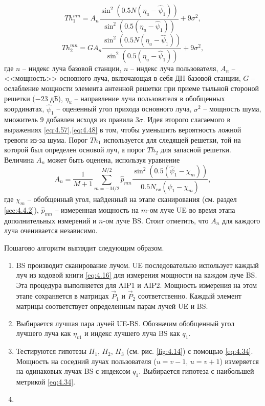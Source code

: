 \begin{equation}
    \label{eq:4.57}
    Th_1^{mn} = A_n \frac{\sin^2(0.5 N (\eta_u - \hat \psi_1))}{\sin^2(0.5 (\eta_u - \hat \psi_1))} + 9 \sigma^2,
\end{equation}
\begin{equation}
    \label{eq:4.58}
    Th_2^{mn} = G A_n \frac{\sin^2(0.5 N (\eta_u - \hat \psi_1))}{\sin^2(0.5 (\eta_u - \hat \psi_1))} + 9 \sigma^2,
\end{equation}
где $n$ -- индекс луча базовой станции, $n$ -- индекс луча пользователя, $A_n$
-- <<мощность>> основного луча, включающая в себя ДН базовой станции, $G$ --
ослабление мощности элемента антенной решетки при приеме тыльной стороной
решетки ($-23$ дБ), $\eta_u$ -- направление луча пользователя в обобщенных
координатах, $\hat \psi_1$ -- оцененный угол прихода основного луча, $\sigma^2$
-- мощность шума, множитель $9$ добавлен исходя из правила $3\sigma$. Идея второго слагаемого в выражениях \eqref{eq:4.57},\eqref{eq:4.48} в том, чтобы 
уменьшить вероятность ложной тревоги из-за шума. Порог $Th_1$ используется для следящей решетки, той на которой был определен основой луч, а порог $Th_2$ для запасной решетки.
Величина $A_n$ может быть оценена, используя уравнение 
\begin{equation}
    A_n = \frac{1}{M+1} \sum\limits_{m=-M/2}^{M/2} \hat p_{mn} 
    \frac{\sin^2(0.5(\hat \psi_1 - \chi_m))}{0.5 N_{rx}(\hat \psi_1 - \chi_m)},
\end{equation}
где $\chi_m$ -- обобщенный угол, найденный на этапе сканирования (см. раздел \eqref{sec:4.4.2}), $\hat p_{mn}$ -- 
измеренная мощность на $m$-ом луче UE во время этапа дополнительных измерений и $n$-ом луче BS. Стоит отметить, что $A_n$ для каждого луча оченивается независимо. 

Пошагово алгоритм выглядит следующим образом. 
\begin{enumerate}[label=\textbf{Шаг \arabic*:}]
    \item BS производит сканирование лучом. UE последовательно использует
    каждый луч из кодовой книги \eqref{eq:4.16} для измерения мощности на каждом луче BS.
    Эта процедура выполняется для AIP1 и AIP2. Мощность измерения на этом этапе сохраняется в
    матрицах $\vec P_1$ и $\vec P_2$ соответственно. Каждый элемент матрицы соответствует
    определенным парам лучей UE и BS.
    \item Выбирается лучшая пара лучей UE-BS. Обозначим обобщенный угол лучшего луча как $\eta_{v1}$ и индекс лучшего луча BS как 
    $q_1$. 
    \item Тестируются гипотезы $H_1$, $H_2$, $H_3$ (см. рис. \ref{fig:4.14}) с помощью \eqref{eq:4.34}. Мощность на соседний лучах пользователя 
    ($u=v-1$, $u=v+1$) измеряется на одинаковых лучах BS с индексом $q_1$. Выбирается гипотеза с наибольшей метрикой \eqref{eq:4.34}.
    \item 
\end{enumerate}



